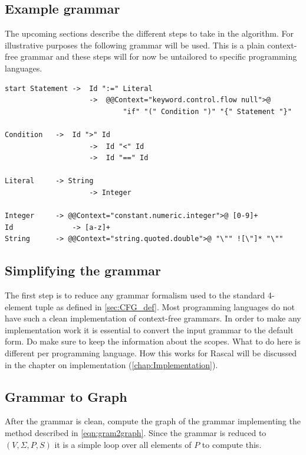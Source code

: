  	\subsection{Example grammar}
 	The upcoming sections describe the different steps to take in the algorithm. For illustrative purposes the following grammar will be used. This is a plain context-free grammar and these steps will for now be untailored to specific programming languages.
\begin{lstlisting}[language=RascalGrammar]
start Statement	->	Id ":=" Literal
					->	@@Context="keyword.control.flow null">@ 
							"if" "(" Condition ")" "{" Statement "}"

Condition	->	Id ">" Id
			 		->	Id "<" Id
					->	Id "==" Id

Literal		-> String
					-> Integer

Integer		-> @@Context="constant.numeric.integer">@ [0-9]+
Id				-> [a-z]+
String		-> @@Context="string.quoted.double">@ "\"" ![\"]* "\""
\end{lstlisting}

	\subsection{Simplifying the grammar}
	The first step is to reduce any grammar formalism used to the standard 4-element tuple as defined in \ref{sec:CFG_def}. Most programming languages do not have such a clean implementation of context-free grammars. In order to make any implementation work it is essential to convert the input grammar to the default form. Do make sure to keep the information about the scopes. What to do here is different per programming language. How this works for Rascal will be discussed in the chapter on implementation (\ref{chap:Implementation}).
	\pagebreak
	
	\subsection{Grammar to Graph}
	After the grammar is clean, compute the graph of the grammar implementing the method described in \ref{eqn:gram2graph}. Since the grammar is reduced to $(V, \Sigma, P, S)$ it is a simple loop over all elements of $P$ to compute this.

